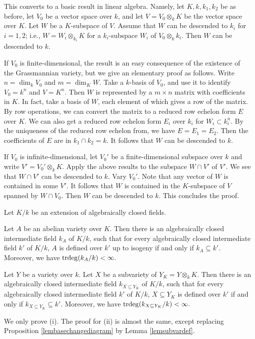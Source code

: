 \documentclass[12pt]{amsart}
\begin{document}
This converts to a basic result in linear algebra.  
Namely, let $K,k,k_1,k_2$ be as before, let $V_0$ be a vector space over $k$, and let $V=V_0\otimes_kK$ be the vector space over $K$.
Let $W$ be a $K$-subspace of $V$. 
Assume that $W$ can be descended to $k_i$ for $i=1,2$; i.e.,
$W=W_i\otimes_{k_i}K$ for a $k_i$-subspace $W_i$ of $V_0\otimes_kk_i$. 
Then $W$ can be descended to $k$. 

If $V_0$ is finite-dimensional, the result is an easy consequence of the existence of the Grassmannian variety, but we give an elementary proof as follows.
Write $n=\dim_k V_0$ and $m=\dim_K W$. 
Take a $k$-basis of $V_0$, and use it to identify $V_0=k^n$ and $V=K^n$.
Then $W$ is represented by a $m\times n$ matrix with coefficients in $K$. 
In fact, take a basis of $W$, each element of which gives a row of the matrix.
By row operations, we can convert the matrix to a reduced row echelon form $E$ over $K$. 
We can also get a reduced row echelon form $E_i$ over $k_i$ for $W_i\subset k_i^n$. 
By the uniqueness of the reduced row echelon from, we have $E=E_1=E_2$. Then the coefficients of $E$
are in $k_1\cap k_2=k$.
It follows that $W$ can be descended to $k$.

If $V_0$ is infinite-dimensional, let $V_0'$ be a finite-dimensional subspace over $k$ and write $V'=V_0'\otimes_kK$.
Apply the above results to the subspace $W\cap V'$ of $V'$. 
We see that $W\cap V'$ can be descended to $k$.
Vary $V_0'$. Note that any vector of $W$ is contained in some $V'$. 
It follows that $W$ is contained in the $K$-subspace of $V$ spanned by $W\cap V_0$. 
Then $W$ can be descended to $k$.
This concludes the proof.
\endproof





\begin{cor}\label{cordeffield}
Let $K/k$ be an extension of algebraically closed fields. 
\begin{points}
\item Let $A$ be an abelian variety over $K.$
Then there is an algebraically closed intermediate field $k_A$ of $K/k$, such that for every algebraically closed intermediate field $k'$ of $K/k$, 
$A$ is defined over $k'$ up to isogeny if and only if $k_A\subseteq k'.$
Moreover, we have ${\mathrm{trdeg}}(k_A/k)<\infty.$
\item Let $Y$ be a variety over $k$. Let $X$ be a subvariety of $Y_K=Y\otimes_kK.$
Then there is an algebraically closed intermediate field $k_{X\subseteq Y_K}$ of $K/k$, such that for every algebraically closed intermediate field $k'$ of $K/k$,
$X\subseteq Y_K$ is defined over $k'$ if and only if $k_{X\subseteq Y_K}\subseteq k'.$
Moreover, we have ${\mathrm{trdeg}}(k_{X\subseteq Y_K}/k)<\infty.$
\end{points}
\end{cor}
\proof
We only prove (i). The proof for (ii) is almost the same, except replacing  Proposition \ref{lembasechangediagram} by Lemma \ref{lemsubvardef}.
\end{document}
